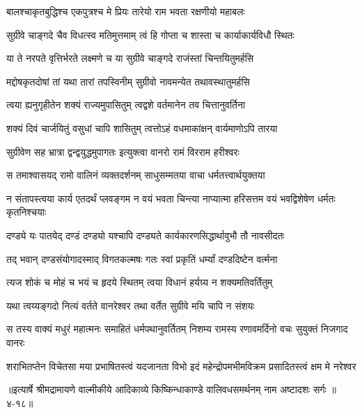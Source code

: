 \twolineshloka
{बालश्चाकृतबुद्धिश्च एकपुत्रश्च मे प्रियः}
{तारेयो राम भवता रक्षणीयो महाबलः} %

\twolineshloka
{सुग्रीवे चाङ्गदे चैव विधत्स्व मतिमुत्तमाम्}
{त्वं हि गोप्ता च शास्ता च कार्याकार्यविधौ स्थितः} %

\twolineshloka
{या ते नरपते वृत्तिर्भरते लक्ष्मणे च या}
{सुग्रीवे चाङ्गदे राजंस्तां चिन्तयितुमर्हसि} %

\twolineshloka
{मद्दोषकृतदोषां तां यथा तारां तपस्विनीम्}
{सुग्रीवो नावमन्येत तथावस्थातुमर्हसि} %

\twolineshloka
{त्वया ह्यनुगृहीतेन शक्यं राज्यमुपासितुम्}
{त्वद्वशे वर्तमानेन तव चित्तानुवर्तिना} %

\twolineshloka
{शक्यं दिवं चार्जयितुं वसुधां चापि शासितुम्}
{त्वत्तोऽहं वधमाकांक्षन् वार्यमाणोऽपि तारया} %

\twolineshloka
{सुग्रीवेण सह भ्रात्रा द्वन्द्वयुद्धमुपागतः}
{इत्युक्त्वा वानरो रामं विरराम हरीश्वरः} %

\twolineshloka
{स तमाश्वासयद् रामो वालिनं व्यक्तदर्शनम्}
{साधुसम्मतया वाचा धर्मतत्त्वार्थयुक्तया} %

\threelineshloka
{न संतापस्त्वया कार्य एतदर्थं प्लवङ्गम}
{न वयं भवता चिन्त्या नाप्यात्मा हरिसत्तम}
{वयं भवद्विशेषेण धर्मतः कृतनिश्चयाः} %

\twolineshloka
{दण्ड्ये यः पातयेद् दण्डं दण्ड्यो यश्चापि दण्ड्यते}
{कार्यकारणसिद्धार्थावुभौ तौ नावसीदतः} %

\twolineshloka
{तद् भवान् दण्डसंयोगादस्माद् विगतकल्मषः}
{गतः स्वां प्रकृतिं धर्म्यां दण्डदिष्टेन वर्त्मना} %

\twolineshloka
{त्यज शोकं च मोहं च भयं च हृदये स्थितम्}
{त्वया विधानं हर्यग्र्य न शक्यमतिवर्तितुम्} %

\twolineshloka
{यथा त्वय्यङ्गदो नित्यं वर्तते वानरेश्वर}
{तथा वर्तेत सुग्रीवे मयि चापि न संशयः} %

\twolineshloka
{स तस्य वाक्यं मधुरं महात्मनः समाहितं धर्मपथानुवर्तितम्}
{निशम्य रामस्य रणावमर्दिनो वचः सुयुक्तं निजगाद वानरः} %

\twolineshloka
{शराभितप्तेन विचेतसा मया प्रभाषितस्त्वं यदजानता विभो}
{इदं महेन्द्रोपमभीमविक्रम प्रसादितस्त्वं क्षम मे नरेश्वर} %


॥इत्यार्षे श्रीमद्रामायणे वाल्मीकीये आदिकाव्ये किष्किन्धाकाण्डे वालिवधसमर्थनम् नाम अष्टादशः सर्गः ॥४-१८॥
